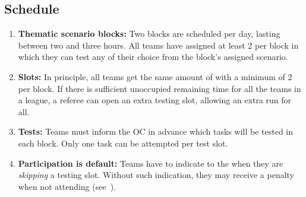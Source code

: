\subsection{Schedule}
\label{rule:schedule}

\begin{enumerate}
	\item \textbf{Thematic scenario blocks:} Two blocks are scheduled per day, lasting between two and three hours.
	All teams have assigned at least 2  per block in which they can test any  of their choice from the block's assigned scenario.

	\item \textbf{Slots:} In principle, all teams get the same amount of  with a minimum of 2 per block.
	If there is sufficient unoccupied remaining time for all the teams in a league, a referee can open an extra testing slot, allowing an extra run for all.

	\item \textbf{Tests:} Teams must inform the OC in advance which tasks will be tested in each block.
	Only one task can be attempted per test slot.

	\item \textbf{Participation is default:} Teams have to indicate to the  when they are \emph{skipping} a testing slot. Without such indication, they may receive a penalty when not attending (see~).
\end{enumerate}


